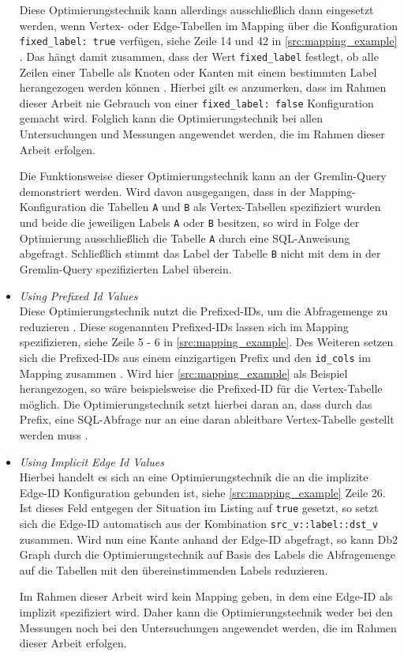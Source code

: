 \begin{itemize}
    Diese Optimierungstechnik kann allerdings ausschließlich dann eingesetzt werden, wenn Vertex- oder Edge-Tabellen im Mapping über die Konfiguration \texttt{fixed\_label: true} verfügen, siehe Zeile 14 und 42 in \autoref{src:mapping_example} \cite{sigmod_tian}. Das hängt damit zusammen, dass der Wert \texttt{fixed\_label} festlegt, ob alle Zeilen einer Tabelle als Knoten oder Kanten mit einem bestimmten Label herangezogen werden können \cite{sigmod_tian}. Hierbei gilt es anzumerken, dass im Rahmen dieser Arbeit nie Gebrauch von einer \texttt{fixed\_label: false} Konfiguration gemacht wird. Folglich kann die Optimierungstechnik bei allen Untersuchungen und Messungen angewendet werden, die im Rahmen dieser Arbeit erfolgen. 

    Die Funktionsweise dieser Optimierungstechnik kann an der Gremlin-Query  demonstriert werden. Wird davon ausgegangen, dass in der Mapping-Konfiguration die Tabellen \texttt{A} und \texttt{B} als Vertex-Tabellen spezifiziert wurden und beide die jeweiligen Labels \texttt{A} oder \texttt{B} besitzen, so wird in Folge der Optimierung ausschließlich die Tabelle \texttt{A} durch eine SQL-Anweisung abgefragt. Schließlich stimmt das Label der Tabelle \texttt{B} nicht mit dem in der Gremlin-Query spezifizierten Label überein.

    \item \textit{Using Prefixed Id Values}\\
    Diese Optimierungstechnik nutzt die Prefixed-IDs, um die Abfragemenge zu reduzieren \cite{sigmod_tian}. Diese sogenannten Prefixed-IDs lassen sich im Mapping spezifizieren, siehe Zeile 5 - 6 in \autoref{src:mapping_example}. Des Weiteren setzen sich die Prefixed-IDs aus einem einzigartigen Prefix und den \texttt{id\_cols} im Mapping zusammen \cite{sigmod_tian}. Wird hier \autoref{src:mapping_example} als Beispiel herangezogen, so wäre beispielsweise die Prefixed-ID  für die Vertex-Tabelle möglich. Die Optimierungstechnik setzt hierbei daran an, dass durch das Prefix, eine SQL-Abfrage nur an eine daran ableitbare Vertex-Tabelle gestellt werden muss \cite{sigmod_tian}.

    \item \textit{Using Implicit Edge Id Values}\\
    Hierbei handelt es sich an eine Optimierungstechnik die an die implizite Edge-ID Konfiguration gebunden ist, siehe \autoref{src:mapping_example} Zeile 26. Ist dieses Feld entgegen der Situation im Listing auf \texttt{true} gesetzt, so setzt sich die Edge-ID automatisch aus der Kombination \texttt{src\_v::label::dst\_v} zusammen. Wird nun eine Kante anhand der Edge-ID abgefragt, so kann Db2 Graph durch die Optimierungstechnik auf Basis des Labels die Abfragemenge auf die Tabellen mit den übereinstimmenden Labels reduzieren. 

    Im Rahmen dieser Arbeit wird kein Mapping geben, in dem eine Edge-ID als implizit spezifiziert wird. Daher kann die Optimierungstechnik weder bei den Messungen noch bei den Untersuchungen angewendet werden, die im Rahmen dieser Arbeit erfolgen. 
\end{itemize}

